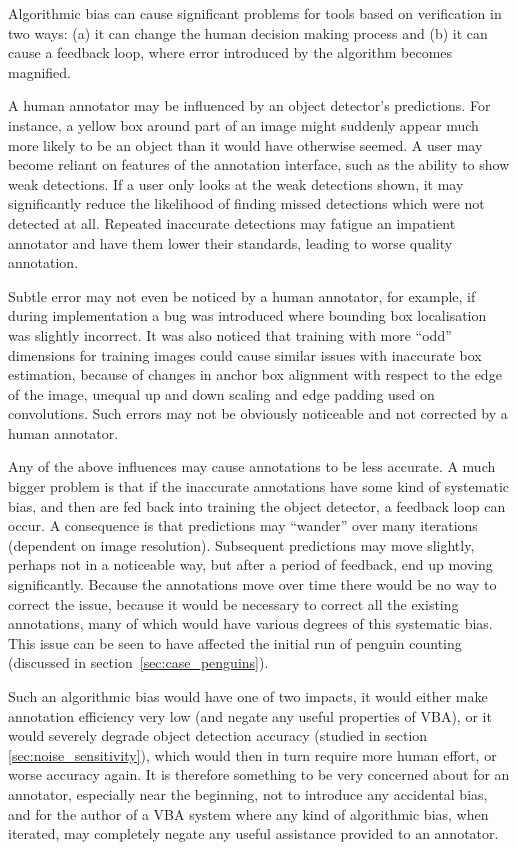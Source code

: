 Algorithmic bias can cause significant problems for tools based on verification in two ways: (a) it can change the human decision making process and (b) it can cause a feedback loop, where error introduced by the algorithm becomes magnified.

A human annotator may be influenced by an object detector's predictions. For instance, a yellow box around part of an image might suddenly appear much more likely to be an object than it would have otherwise seemed. A user may become reliant on features of the annotation interface, such as the ability to show weak detections. If a user only looks at the weak detections shown, it may significantly reduce the likelihood of finding missed detections which were not detected at all. Repeated inaccurate detections may fatigue an impatient annotator and have them lower their standards, leading to worse quality annotation. 

Subtle error may not even be noticed by a human annotator, for example,  if during implementation a bug was introduced where bounding box localisation was slightly incorrect. It was also noticed that training with more ``odd'' dimensions for training images could cause similar issues with inaccurate box estimation, because of changes in anchor box alignment with respect to the edge of the image, unequal up and down scaling and edge padding used on convolutions. Such errors may not be obviously noticeable and not corrected by a human annotator.
 
Any of the above influences may cause annotations to be less accurate. A much bigger problem is that if the inaccurate annotations have some kind of systematic bias, and then are fed back into training the object detector, a feedback loop can occur. A consequence is that predictions may ``wander'' over many iterations (dependent on image resolution). Subsequent predictions may move slightly, perhaps not in a noticeable way, but after a period of feedback, end up moving significantly. Because the annotations move over time there would be no way to correct the issue, because it would be necessary to correct all the existing annotations, many of which would have various degrees of this systematic bias. This issue can be seen to have affected the initial run of penguin counting (discussed in section~\ref{sec:case_penguins}).  

Such an algorithmic bias would have one of two impacts, it would either make annotation efficiency very low (and negate any useful properties of \gls{VBA}), or it would severely degrade object detection accuracy (studied in section~ \ref{sec:noise_sensitivity}), which would then in turn require more human effort, or worse accuracy again. It is therefore something to be very concerned about for an annotator, especially near the beginning, not to introduce any accidental bias, and for the author of a \gls{VBA} system where any kind of algorithmic bias, when iterated, may completely negate any useful assistance provided to an annotator.


